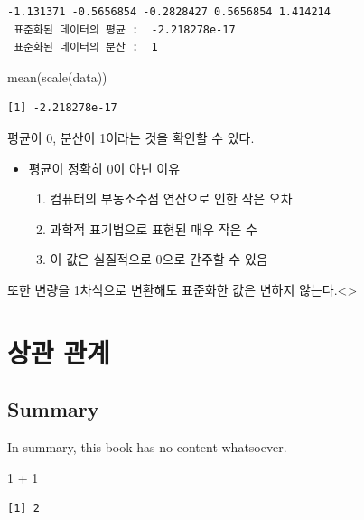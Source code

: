 \documentclass[
  letterpaper,
  DIV=11,
  numbers=noendperiod]{scrreprt}
\newenvironment{Shaded}{\begin{snugshade}}{\end{snugshade}}
\newcommand{\DecValTok}[1]{\textcolor[rgb]{0.68,0.00,0.00}{#1}}
\newcommand{\FunctionTok}[1]{\textcolor[rgb]{0.28,0.35,0.67}{#1}}
\newcommand{\NormalTok}[1]{\textcolor[rgb]{0.00,0.23,0.31}{#1}}
\newcommand{\SpecialCharTok}[1]{\textcolor[rgb]{0.37,0.37,0.37}{#1}}
\providecommand{\tightlist}{%
  \setlength{\itemsep}{0pt}\setlength{\parskip}{0pt}}\usepackage{longtable,booktabs,array}
\begin{document}
\begin{verbatim}
-1.131371 -0.5656854 -0.2828427 0.5656854 1.414214 
 표준화된 데이터의 평균 :  -2.218278e-17 
 표준화된 데이터의 분산 :  1
\end{verbatim}

\begin{Shaded}
\begin{Highlighting}[]
\FunctionTok{mean}\NormalTok{(}\FunctionTok{scale}\NormalTok{(data))}
\end{Highlighting}
\end{Shaded}

\begin{verbatim}
[1] -2.218278e-17
\end{verbatim}

평균이 0, 분산이 1이라는 것을 확인할 수 있다.

\begin{itemize}
\tightlist
\item
  평균이 정확히 0이 아닌 이유

  \begin{enumerate}
  \def\labelenumi{\arabic{enumi}.}
  \tightlist
  \item
    컴퓨터의 부동소수점 연산으로 인한 작은 오차
  \item
    과학적 표기법으로 표현된 매우 작은 수
  \item
    이 값은 실질적으로 0으로 간주할 수 있음
  \end{enumerate}
\end{itemize}

또한 변량을 1차식으로 변환해도 표준화한 값은 변하지
않는다.\textless\textgreater{}

\part{상관 관계}

\hypertarget{summary}{%
\chapter{Summary}\label{summary}}

In summary, this book has no content whatsoever.

\begin{Shaded}
\begin{Highlighting}[]
\DecValTok{1} \SpecialCharTok{+} \DecValTok{1}
\end{Highlighting}
\end{Shaded}

\begin{verbatim}
[1] 2
\end{verbatim}
\end{document}
